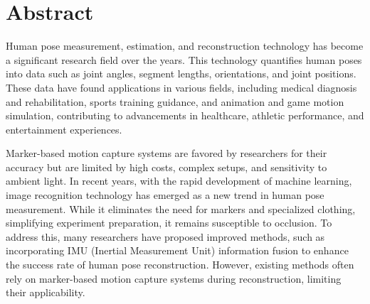 \chapter{Abstract}

Human pose measurement, estimation, and reconstruction technology has become a significant research field over the years. This technology quantifies human poses into data such as joint angles, segment lengths, orientations, and joint positions. These data have found applications in various fields, including medical diagnosis and rehabilitation, sports training guidance, and animation and game motion simulation, contributing to advancements in healthcare, athletic performance, and entertainment experiences.

Marker-based motion capture systems are favored by researchers for their accuracy but are limited by high costs, complex setups, and sensitivity to ambient light. In recent years, with the rapid development of machine learning, image recognition technology has emerged as a new trend in human pose measurement. While it eliminates the need for markers and specialized clothing, simplifying experiment preparation, it remains susceptible to occlusion. To address this, many researchers have proposed improved methods, such as incorporating IMU (Inertial Measurement Unit) information fusion to enhance the success rate of human pose reconstruction. However, existing methods often rely on marker-based motion capture systems during reconstruction, limiting their applicability.



